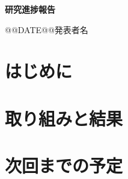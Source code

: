 \documentclass[a4j,10pt,uplatex,dvipdfmx]{jsarticle}
\makeatletter
\newcommand{\reportTitle}{研究進捗報告}
\newcommand{\reportAuthor}{発表者名}
\newcommand{\reportDate}{@@DATE@@}
\makeatother
\begin{document}
\begin{center}
  {\Large\bfseries \reportTitle\par}
  \vspace{2mm}
  \reportDate\quad \reportAuthor
\end{center}

\section{はじめに}

\section{取り組みと結果}

\section{次回までの予定}

% 
% 
\end{document}
